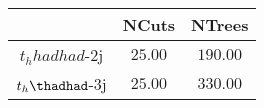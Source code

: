 \centering
\begin{tabular}{|c|c|c|} \hline
 & NCuts & NTrees\\\hline
$t_h	hadhad$-2j  & $25.00$ & $190.00$\\\hline
$t_h\thadhad$-3j & $25.00$ & $330.00$\\\hline
\end{tabular} 